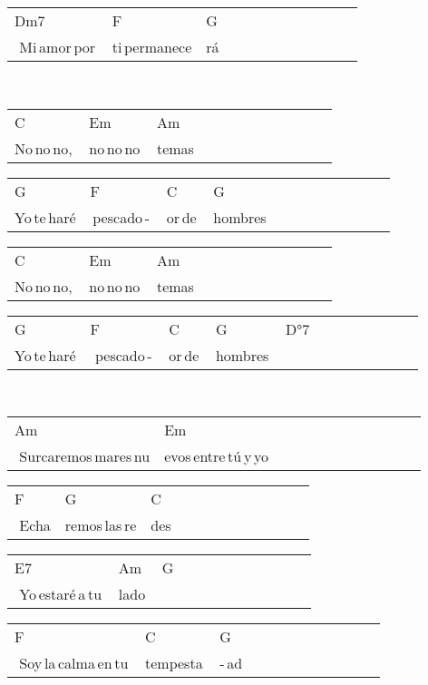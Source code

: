 \begin{multicols}{2}
\begin{minipage}{\columnwidth}
\noindent
\begin{tabular}{llllllllllll}
Dm7&F&G\\
\,\,Mi\,amor\,por\,&ti\,permanece&rá
\end{tabular}
\end{minipage}\\

\noindent
\begin{minipage}{\columnwidth}
\noindent
\noindent
\begin{tabular}{llllllllllll}
C&Em&Am\\
No\,no\,no,\,&no\,no\,no\,&temas
\end{tabular}

\noindent
\begin{tabular}{llllllllllll}
G&F&C&G\\
Yo\,te\,haré&\,pescado\,-\,&or\,de\,&hombres
\end{tabular}

\noindent
\begin{tabular}{llllllllllll}
C&Em&Am\\
No\,no\,no,\,&no\,no\,no\,&temas
\end{tabular}

\noindent
\begin{tabular}{llllllllllll}
G&F&C&G&D°7\\
Yo\,te\,haré&\,\,pescado\,-\,&or\,de\,&hombres\,&
\end{tabular}
\end{minipage}\\

\noindent
\begin{minipage}{\columnwidth}
\noindent
\noindent
\begin{tabular}{llllllllllll}
Am&Em\\
\,\,Surcaremos\,mares\,nu&evos\,entre\,tú\,y\,yo
\end{tabular}

\noindent
\begin{tabular}{llllllllllll}
F&G&C\\
\,\,Echa&remos\,las\,re&des
\end{tabular}

\noindent
\begin{tabular}{llllllllllll}
E7&Am&G\\
\,\,Yo\,estaré\,a\,tu\,&lado\,&
\end{tabular}

\noindent
\begin{tabular}{llllllllllll}
F&C&G\\
\,\,Soy\,la\,calma\,en\,tu\,&tempesta\,&-\,ad
\end{tabular}
\end{minipage}\\



\end{multicols}
